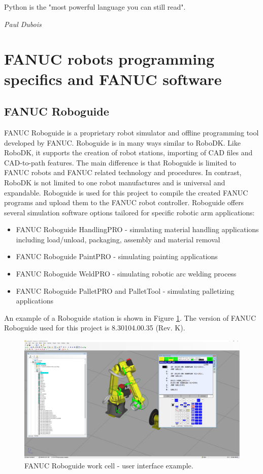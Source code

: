 \label{chap:implementation}

\epigraph{Python is the "most powerful language you can still read".}{\textit{Paul Dubois}}

\section{FANUC robots programming specifics and FANUC software}

\subsection{FANUC Roboguide}

FANUC Roboguide is a proprietary robot simulator and offline programming tool developed by FANUC. Roboguide is in many ways similar to RoboDK.  Like RoboDK, it supports the creation of robot stations, importing of CAD files and CAD-to-path features. The main difference is that Roboguide is limited to FANUC robots and FANUC related technology and procedures. In contrast, RoboDK is not limited to one robot manufactures and is universal and expandable. Roboguide is used for this project to compile the created FANUC programs and upload them to the FANUC robot controller. Roboguide offers several simulation software options tailored for specific robotic arm applications:

\begin{itemize}

\item FANUC Roboguide HandlingPRO - simulating material handling applications including load/unload, packaging, assembly and material removal
\item FANUC Roboguide PaintPRO - simulating painting applications
\item FANUC Roboguide WeldPRO - simulating robotic arc welding process
\item FANUC Roboguide PalletPRO and PalletTool - simulating palletizing applications

\end{itemize}

An example of a Roboguide station is shown in Figure \ref{fig:roboguide}. The version of FANUC Roboguide used for this project is 8.30104.00.35 (Rev. K). 

\begin{figure}[h]
    \centering
    \includegraphics[width=0.9\linewidth]{img/roboguide.PNG}
    \caption{FANUC Roboguide work cell - user interface example.}
    \label{fig:roboguide}
\end{figure}

